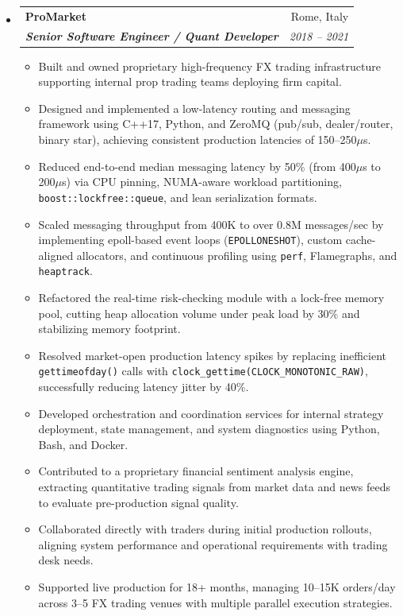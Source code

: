 \documentclass[letterpaper,10pt]{article}
\makeatletter
\newcommand{\resumeItem}[1]{
  \item\small{
    {#1 \vspace{-2pt}}
  }
}
\newcommand{\resumeSubheading}[4]{
  \vspace{-1pt}\item
    \begin{tabular*}{0.97\textwidth}[t]{l@{\extracolsep{\fill}}r}
      \textbf{#1} & #2 \\
      \textit{\small#3} & \textit{\small #4} \\
    \end{tabular*}\vspace{-5pt}
}
\makeatother
\begin{document}
\begin{itemize}[leftmargin=0.15in, label={}]
    \newpage
    \resumeSubheading
      {ProMarket}{Rome, Italy}
      {\textbf{Senior Software Engineer / Quant Developer}}{2018 -- 2021}
      \begin{itemize}
        \resumeItem{Built and owned proprietary high-frequency FX trading 
        infrastructure supporting internal prop trading teams deploying 
        firm capital.}
        \resumeItem{Designed and implemented a low-latency routing and 
        messaging framework using C++17, Python, and ZeroMQ 
        (pub/sub, dealer/router, binary star), achieving consistent 
        production latencies of 150--250$\mu$s.}
        \resumeItem{Reduced end-to-end median messaging latency by 50\% 
        (from 400$\mu$s to 200$\mu$s) via CPU pinning, NUMA-aware workload 
        partitioning, \texttt{boost::lockfree::queue}, and lean 
        serialization formats.}
        \resumeItem{Scaled messaging throughput from 400K to over 0.8M 
        messages/sec by implementing epoll-based event loops 
        \newline
        (\texttt{EPOLLONESHOT}), custom cache-aligned allocators, 
        and continuous profiling using \texttt{perf}, Flamegraphs, 
        and \texttt{heaptrack}.}
        \resumeItem{Refactored the real-time risk-checking module with 
        a lock-free memory pool, cutting heap allocation volume under 
        peak load by 30\% and stabilizing memory footprint.}
        \resumeItem{Resolved market-open production latency spikes by 
        replacing inefficient \texttt{gettimeofday()} calls with 
        \newline
        \texttt{clock\_gettime(CLOCK\_MONOTONIC\_RAW)}, successfully 
        reducing latency jitter by 40\%.}
        \resumeItem{Developed orchestration and coordination services 
        for internal strategy deployment, state management, and system 
        diagnostics using Python, Bash, and Docker.}
        \resumeItem{Contributed to a proprietary financial sentiment 
        analysis engine, extracting quantitative trading signals from 
        market data and news feeds to evaluate pre-production signal quality.}
        \resumeItem{Collaborated directly with traders during initial 
        production rollouts, aligning system performance and operational 
        requirements with trading desk needs.}
        \resumeItem{Supported live production for 18+ months, managing 
        10--15K orders/day across 3--5 FX trading venues with multiple 
        parallel execution strategies.}
      \end{itemize}

  \end{itemize}
\end{document}
